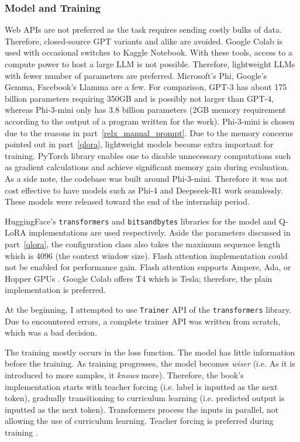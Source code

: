 \documentclass{article}
\begin{document}
\subsubsection{Model and Training}
Web APIs are not preferred as the task requires sending costly bulks of data. Therefore, closed-source GPT variants and alike are avoided. Google Colab is used with occasional switches to Kaggle Notebook. With these tools, access to a compute power to host a large LLM is not possible. Therefore, lightweight LLMs with fewer number of parameters are preferred. Microsoft's Phi, Google's Gemma, Facebook's Llamma are a few. For comparison, GPT-3 has about 175 billion parameters requiring 350GB \cite{brown_language_2020} and is possibly not larger than GPT-4, whereas Phi-3-mini only has 3.8 billion parameters \cite{abdin_phi-3_2024} (2GB memory requirement according to the output of a program written for the work). Phi-3-mini is chosen due to the reasons in part~\ref{relx_manual_prompt}. Due to the memory concerns pointed out in part~\ref{qlora}, lightweight models become extra important for training. PyTorch library enables one to disable unnecessary computations such as gradient calculations and achieve significant memory gain during evaluation. As a side note, the codebase was built around Phi-3-mini. Therefore it was not cost effective to have models such as Phi-4 and Deepseek-R1 work seamlessly. These models were released toward the end of the internship period.

HuggingFace's \texttt{transformers} and \texttt{bitsandbytes} libraries for the model and Q-LoRA implementations are used respectively. Aside the parameters discussed in part~\ref{qlora}, the configuration class also takes the maximum sequence length which is 4096 (the context window size). Flash attention implementation could not be enabled for performance gain. Flash attention supports Ampere, Ada, or Hopper GPUs \cite{dao-ailab_github_2022}. Google Colab offers T4 which is Tesla; therefore, the plain implementation is preferred.

At the beginning, I attempted to use \texttt{Trainer} API of the \texttt{transformers} library. Due to encountered errors, a complete trainer API was written from scratch, which was a bad decision.

The training mostly occurs in the loss function. The model has little information before the training. As training progresses, the model becomes \textit{wiser} (i.e. As it is introduced to more samples, it \textit{knows} more). Therefore, the book's implementation starts with teacher forcing (i.e. label is inputted as the next token), gradually transitioning to curriculum learning (i.e. predicted output is inputted as the next token). Transformers process the inputs in parallel, not allowing the use of curriculum learning. Teacher forcing is preferred during training \cite{lapan_deep_2020}.
\end{document}
